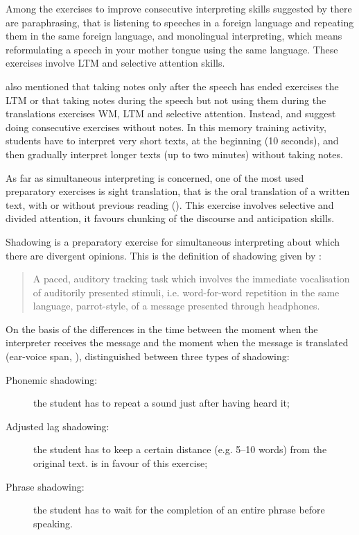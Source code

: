 \documentclass[output=paper]{../langscibook}
\begin{document}
Among the exercises to improve consecutive interpreting skills suggested by \citet{Gillies2013} there are paraphrasing, that is listening to speeches in a foreign language and repeating them in the same foreign language, and monolingual interpreting, which means reformulating a speech in your mother tongue using the same language. These exercises involve LTM and selective attention skills.

\citet{Gillies2013} also mentioned that taking notes only after the speech has ended exercises the LTM or that taking notes during the speech but not using them during the translations exercises WM, LTM and selective attention. Instead, \citet{ChabasseDingerfelderStone2015} and \citet{SettonDawrant2016a} suggest doing consecutive exercises without notes. In this memory training activity, students have to interpret very short texts, at the beginning (10 seconds), and then gradually interpret longer texts (up to two minutes) without taking notes.

As far as simultaneous interpreting is concerned, one of the most used preparatory exercises is sight translation, that is the oral translation of a written text, with or without previous reading (\citealt{Kalina1992,Kalina2000,PadillaBenitez2002,Gillies2013,SettonDawrant2016a}). This exercise involves selective and divided attention, it favours chunking of the discourse and anticipation skills.

\hspace*{-1mm}Shadowing is a preparatory exercise for simultaneous interpreting about which there are divergent opinions. This is the definition of shadowing given by \citet{Lambert1988}:

\begin{quote}
A paced, auditory tracking task which involves the immediate vocalisation of auditorily presented stimuli, i.e. word-for-word repetition in the same language, parrot-style, of a message presented through headphones. \citep[381]{Lambert1988}
\end{quote}

On the basis of the differences in the time between the moment when the interpreter receives the message and the moment when the message is translated (ear-voice span, \citealt{Goldman-Eisler1972}), \citet{AndresBodenFuchs2015} distinguished between three types of shadowing:

\begin{description}
\item[Phonemic shadowing:] the student has to repeat a sound just after having heard it;
\item[Adjusted lag shadowing:] \sloppy the student has to keep a certain distance (e.g. 5--10 words) from the original text. \citet{PadillaBenitez2002} is in favour of this exercise;
\item[Phrase shadowing:] the student has to wait for the completion of an entire phrase before speaking.
\end{description}
\end{document}
